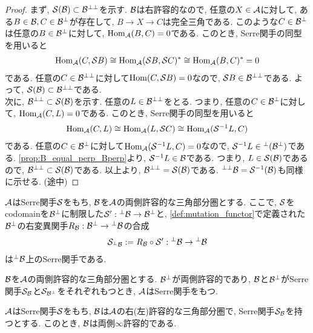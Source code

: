 \documentclass[uplatex, a4paper, 14Q, dvipdfmx]{jsarticle}
\begin{document}
\begin{proof}
  まず, $\S(\B) \subset \Bpp$を示す.
  $\B$は右許容的なので, 任意の$X \in \A$に対して, ある$B \in \B, C \in \Bperp$が存在して, $B \to X \to C$は完全三角である.
  このような$C \in \Bperp$は任意の$B \in \Bperp$に対して, $\Hom_\A(B,C) = 0$である. 
  このとき, Serre関手の同型を用いると
  \begin{align*}
    \Hom_\A(C,\S B) 
    \cong \Hom_\A(\S B, \S C)^\ast
    \cong \Hom_\A(B,C)^\ast
    = 0
  \end{align*}
  である. 
  任意の$C \in \Bpp$に対して$\Hom(C,\S B)  = 0$なので, $\S B \in \Bpp$である.
  よって, $\S(\B) \subset \Bpp$である. \\
  次に, $\Bpp \subset \S(\B)$を示す. 
  任意の$L \in \Bpp$をとる. 
  つまり, 任意の$C \in \Bperp$に対して, $\Hom_\A(C,L) = 0$である. 
  このとき, Serre関手の同型を用いると
  \begin{align*}
    \Hom_\A(C,L)
    \cong \Hom_\A(L,\S C)
    \cong \Hom_\A(\S^{-1}L, C)
  \end{align*}
  である. 
  任意の$C \in \Bperp$に対して$\Hom_\A(\S^{-1}L, C) = 0$なので, $\S^{-1}L \in {}^\perp(\Bperp)$である. 
  \cref{prop:B_equal_perp_Bperp}より, $\S^{-1}L \in \B$である. 
  つまり, $L \in \S(\B)$であるので, $\Bpp \subset \S(\B)$である. 
  以上より, $\Bpp = \S(\B)$である. 
  $\ppB = \S^{-1}(\B)$も同様に示せる.
  (途中)
\end{proof}

\begin{theorem}
  $\A$はSerre関手$\S$をもち, $\B$を$\A$の両側許容的な三角部分圏とする.
  ここで, $\S$をcodomainを$\Bperp$に制限した$\S' : \perpB \to \Bperp$と, \cref{def:mutation_functor}で定義された$\Bperp$の右変異関手$R_\B : \Bperp \to \perpB$の合成
  \begin{align*}
    \S_{\perpB} := R_\B \circ \S' : \perpB \to \perpB
  \end{align*}
  は$\perpB$上のSerre関手である.
\end{theorem}

\begin{theorem}
  $\B$を$\A$の両側許容的な三角部分圏とする.
  $\Bperp$が両側許容的であり, $\B$と$\Bperp$がSerre関手$\S_\B$と$\S_{\Bperp}$をそれぞれもつとき, $\A$はSerre関手をもつ. 
\end{theorem}

\begin{theorem}
  $\A$はSerre関手$\S$をもち, $\B$は$\A$の右(左)許容的な三角部分圏で, Serre関手$\S_\B$を持つとする.
  このとき, $\B$は両側$\infty$許容的である. 
\end{theorem}
\end{document}
